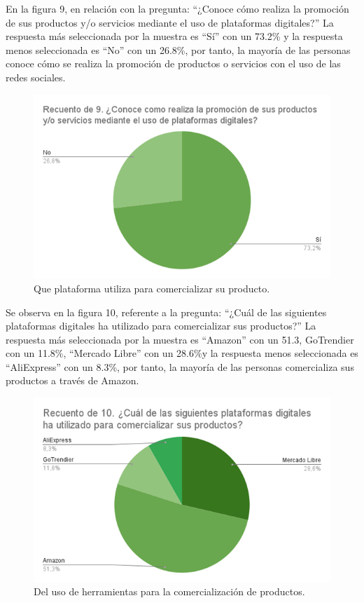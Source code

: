 \documentclass[12pt]{difu100cia} %
\begin{document}
	
En la figura 9, en relación con la pregunta: “¿Conoce cómo realiza la promoción de sus productos y/o servicios mediante el uso de plataformas digitales?” La respuesta más seleccionada por la muestra es “Sí” con un 73.2\% y la respuesta menos seleccionada es “No” con un 26.8\%, por tanto, la mayoría de las personas conoce cómo se realiza la promoción de productos o servicios con el uso de las redes sociales.

\begin{figure}[!htb]
	\centering
	\includegraphics[width=\linewidth]{Figura 10.png}
	\caption{Que plataforma utiliza para comercializar su producto.}
	\label{Figur 10}
\end{figure}
	
Se observa en la figura 10, referente a la pregunta: “¿Cuál de las siguientes plataformas digitales ha utilizado para comercializar sus productos?” La respuesta más seleccionada por la muestra es “Amazon” con un 51.3, GoTrendier con un 11.8\%, “Mercado Libre” con un 28.6\%y la respuesta menos seleccionada es “AliExpress” con un 8.3\%, por tanto, la mayoría de las personas comercializa sus productos a través de Amazon.

\begin{figure}[!htb]
	\centering
	\includegraphics[width=\linewidth]{Figura 11.png}
	\caption{Del uso de herramientas para la comercialización de productos.}
	\label{Figur 11}
\end{figure}
	
\end{document}
